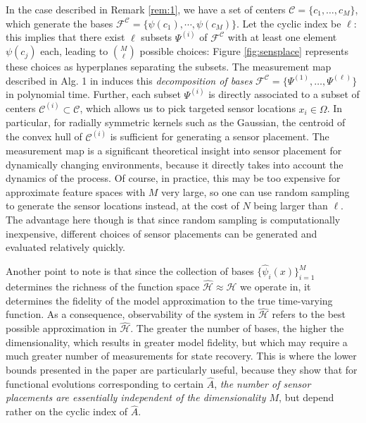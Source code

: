 \documentclass[letterpaper,12pt,peerreviewca,draftcls]{IEEEtran}
\newcommand{\fspace}{\mathcal{H}}
\newcommand{\fmap}{\psi}
\newcommand{\dom}{\Omega}
\newcommand{\nsamp}{N}
\newcommand{\ncent}{M}
\newcommand{\shCent}{\mathcal{C}}
\newcommand{\shCentLong}{\{c_1,\dots,c_{\ncent}\}}
\newcommand{\fspaceApprox}{\widehat{\fspace}}
\newcommand{\fmapApprox}{\widehat{\fmap}}
\newcommand{\Atoms}{\mathcal{F}^{\shCent}}
\newcommand{\minmeas}{\ell}
\newcommand{\dualop}{A}
\newcommand{\dualopApprox}{\widehat{\dualop}}
\newcommand{\Fmap}{\Psi}
\newcommand{\atomSubset}[1]{\Fmap^{(#1)}}
\newcommand{\centerSubset}[1]{\shCent^{(#1)}}
\begin{document}
In the case described in Remark \ref{rem:1}, we have a set of centers $\shCent=\shCentLong$, which generate the bases $\Atoms = \{\fmap(c_1), \cdots , \fmap(c_{\ncent})\}$. Let the cyclic index be $\minmeas$: this implies that there exist $\minmeas$ subsets $\atomSubset{i}$ of $\Atoms$ with at least one element $\fmap(c_j)$ each, leading to $\binom{\ncent}{\minmeas}$ possible choices: Figure \ref{fig:sensplace} represents these choices as hyperplanes separating the subsets. 
The measurement map described in Alg. 1 in \cite{Kingravi16_NIPS} induces this \emph{decomposition of bases} $\Atoms = \{\atomSubset{1},\dots,\atomSubset{\minmeas}\}$ in polynomial time. Further, each subset $\atomSubset{i}$ is directly associated to a subset of centers $\centerSubset{i}\subset\shCent$, which allows us to pick targeted sensor locations $x_i\in\dom$. In particular, for radially symmetric kernels such as the Gaussian, the centroid of the convex hull of $\centerSubset{i}$ is sufficient for generating a sensor placement. The measurement map is a significant theoretical insight into sensor placement for dynamically changing environments, because it directly takes into account the dynamics of the process. Of course, in practice, this may be too expensive for approximate feature spaces with $\ncent$ very large, so one can use random sampling to generate the sensor locations instead, at the cost of $\nsamp$ being larger than $\minmeas$. The advantage here though is that since random sampling is computationally inexpensive, different choices of sensor placements can be generated and evaluated relatively quickly.

Another point to note is that since the collection of bases $\{\fmapApprox_i(x)\}_{i=1}^{\ncent}$ determines the richness of the function space $\fspaceApprox\approx\fspace$ we operate in, it determines the fidelity of the model approximation to the true time-varying function. As a consequence, observability of the system in $\fspaceApprox$ refers to the best possible approximation in $\fspaceApprox$. The greater the number of bases, the higher the dimensionality, which results in greater model fidelity, but which may require a much greater number of measurements for state recovery. This is where the lower bounds presented in the paper are particularly useful, because they show that for functional evolutions corresponding to certain $\dualopApprox$, \emph{the number of sensor placements are essentially independent of the dimensionality $\ncent$}, but depend rather on the cyclic index of $\dualopApprox$.
\end{document}
